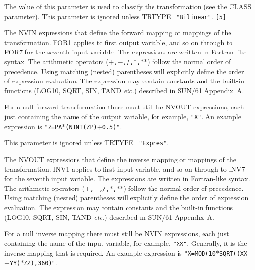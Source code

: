 \documentclass[twoside,11pt]{article}
\newcommand{\sstsubsection}[1]{ \item[{#1}] \mbox{} \\}
\renewcommand{\sstsubsection}[1]{\item[{#1}]}
\begin{document}
{{{         The value of this parameter is used to classify the
         transformation (see the CLASS parameter).  This parameter is
         ignored unless TRTYPE={\tt "Bilinear"}.  {\tt [5]}
      }
      \sstsubsection{
         FOR1-FOR7 = LITERAL (Read)
      }{
         The NVIN expressions that define the forward mapping or
         mappings of the transformation.  FOR1 applies to first
         output variable, and so on through to FOR7 for the seventh
         input variable.  The expressions are written in Fortran-like
         syntax.  The arithmetic operators ({\tt $+$,$-$,/,$*$,$*$$*$})
         follow the normal order of precedence.  Using matching (nested)
         parentheses will explicitly define the order of expression
         evaluation.  The expression may contain constants and the
         built-in functions (LOG10, SQRT, SIN, TAND {\it etc.}) described in
         SUN/61 Appendix~A.

         For a null forward transformation there must still be NVOUT
         expressions, each just containing the name of the output
         variable, for example, {\tt "X"}.  An example expression is
         {\tt "Z=PA$*$(NINT(ZP)$+$0.5)"}.

         This parameter is ignored unless TRTYPE={\tt "Expres"}.
      }
      \sstsubsection{
         INV1-INV7 = LITERAL (Read)
      }{
         The NVOUT expressions that define the inverse mapping or
         mappings of the transformation.  INV1 applies to first
         input variable, and so on through to INV7 for the seventh
         input variable.  The expressions are written in Fortran-like
         syntax.  The arithmetic operators ({\tt $+$,$-$,/,$*$,$*$$*$})
         follow the normal order of precedence.  Using matching (nested)
         parentheses will explicitly define the order of expression
         evaluation.  The expression may contain constants and the
         built-in functions (LOG10, SQRT, SIN, TAND {\it etc.}) described in
         SUN/61 Appendix~A.

         For a null inverse mapping there must still be NVIN
         expressions, each just containing the name of the input
         variable, for example, {\tt "XX"}.  Generally, it is the
         inverse mapping that is required. An example expression is
         {\tt "X=MOD(10$*$SQRT((XX$+$YY)$*$ZZ),360)"}.

}}}
\end{document}
